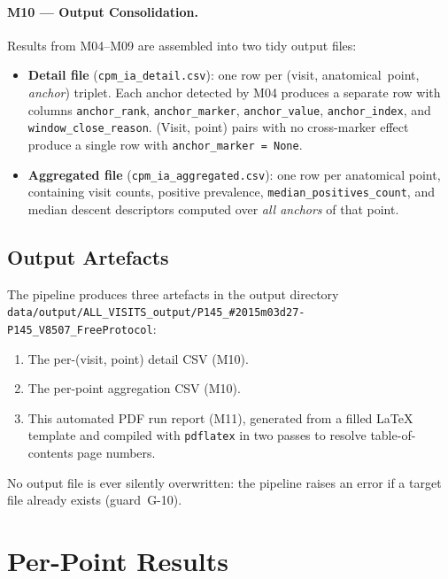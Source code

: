 \documentclass[a4paper,11pt]{article}
\begin{document}
\paragraph{M10 --- Output Consolidation.}
Results from M04--M09 are assembled into two tidy output files:
\begin{itemize}
  \item \textbf{Detail file} (\texttt{cpm\_ia\_detail.csv}): one row per
        (visit, anatomical~point, \emph{anchor}) triplet. Each anchor detected by M04
        produces a separate row with columns \texttt{anchor\_rank},
        \texttt{anchor\_marker}, \texttt{anchor\_value}, \texttt{anchor\_index},
        and \texttt{window\_close\_reason}.
        (Visit, point) pairs with no cross-marker effect produce a single row with
        \texttt{anchor\_marker = None}.
  \item \textbf{Aggregated file} (\texttt{cpm\_ia\_aggregated.csv}): one row per
        anatomical point, containing visit counts, positive prevalence,
        \texttt{median\_positives\_count}, and median descent descriptors computed over
        \emph{all anchors} of that point.
\end{itemize}

\subsection{Output Artefacts}

The pipeline produces three artefacts in the output directory \texttt{data/output/ALL\_VISITS\_output/P145\_\#2015m03d27-P145\_V8507\_FreeProtocol}:
\begin{enumerate}
  \item The per-(visit, point) detail CSV (M10).
  \item The per-point aggregation CSV (M10).
  \item This automated PDF run report (M11), generated from a filled \LaTeX{} template
        and compiled with \texttt{pdflatex} in two passes to resolve table-of-contents
        page numbers.
\end{enumerate}
No output file is ever silently overwritten: the pipeline raises an error if a target
file already exists (guard~G-10).

\section{Per-Point Results}
\end{document}
